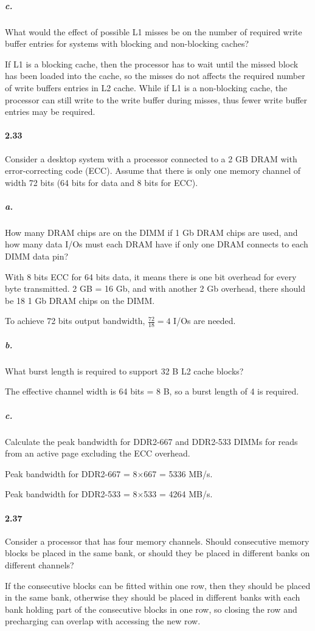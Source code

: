 \documentclass{article}
\begin{document}
\subparagraph{c.} What would the effect of possible L1 misses be on the number of required write buffer entries for systems with blocking and non-blocking caches?

If L1 is a blocking cache, then the processor has to wait until the missed block has been loaded into the cache, so the misses do not affects the required number of write buffers entries in L2 cache. While if L1 is a non-blocking cache, the processor can still write to the write buffer during misses, thus fewer write buffer entries may be required.

\paragraph{2.33} Consider a desktop system with a processor connected to a 2 GB DRAM with error-correcting code (ECC). Assume that there is only one memory channel of width 72 bits (64 bits for data and 8 bits for ECC).

\subparagraph{a.} How many DRAM chips are on the DIMM if 1 Gb DRAM chips are used, and how many data I/Os must each DRAM have if only one DRAM connects to each DIMM data pin?

With 8 bits ECC for 64 bits data, it means there is one bit overhead for every byte transmitted. 2 GB = 16 Gb, and with another 2 Gb overhead, there should be 18 1 Gb DRAM chips on the DIMM.

To achieve 72 bits output bandwidth, $\frac{72}{18}=4$ I/Os are needed.

\subparagraph{b.} What burst length is required to support 32 B L2 cache blocks?

The effective channel width is 64 bits = 8 B, so a burst length of 4 is required.

\subparagraph{c.} Calculate the peak bandwidth for DDR2-667 and DDR2-533 DIMMs for reads from an active page excluding the ECC overhead.

Peak bandwidth for DDR2-667 = 8$\times$667 = 5336 MB/s.

Peak bandwidth for DDR2-533 = 8$\times$533 = 4264 MB/s.

\paragraph{2.37} Consider a processor that has four memory channels. Should consecutive memory blocks be placed in the same bank, or should they be placed in different banks on different channels?

If the consecutive blocks can be fitted within one row, then they should be placed in the same bank, otherwise they should be placed in different banks with each bank holding part of the consecutive blocks in one row, so closing the row and precharging can overlap with accessing the new row.
\end{document}
